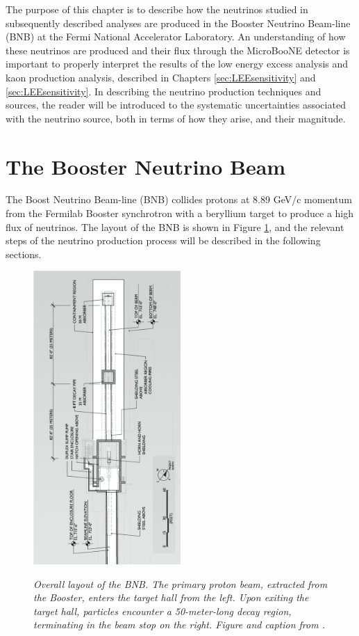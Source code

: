 The purpose of this chapter is to describe how the neutrinos studied in subsequently described analyses are produced in the Booster Neutrino Beam-line (BNB) at the Fermi National Accelerator Laboratory. An understanding of how these neutrinos are produced and their flux through the MicroBooNE detector is important to properly interpret the results of the low energy excess analysis and kaon production analysis, described in Chapters \ref{sec:LEEsensitivity} and \ref{sec:LEEsensitivity}. In describing the neutrino production techniques and sources, the reader will be introduced to the systematic uncertainties associated with the neutrino source, both in terms of how they arise, and their magnitude. 

\section{The Booster Neutrino Beam}\label{beam_descript_section}
The Boost Neutrino Beam-line (BNB) collides protons at 8.89 GeV/c momentum from the Fermilab Booster synchrotron with a beryllium target to produce a high flux of neutrinos. The layout of the BNB is shown in Figure \ref{BNB_layout_schematic}, and the relevant steps of the neutrino production process will be described in the following sections.

\begin{figure}[ht!]
\centering
	\includegraphics[width=0.5\textwidth]{Figures/BNB_layout_schematic.png} \\
\caption{\textit{Overall layout of the BNB. The primary proton beam, extracted from the Booster, enters the target hall from the left. Upon exiting the target hall, particles encounter a 50-meter-long decay region, terminating in the beam stop on the right. Figure and caption from \protect\cite{MBFluxPaper}.}}\label{BNB_layout_schematic}
\end{figure}

